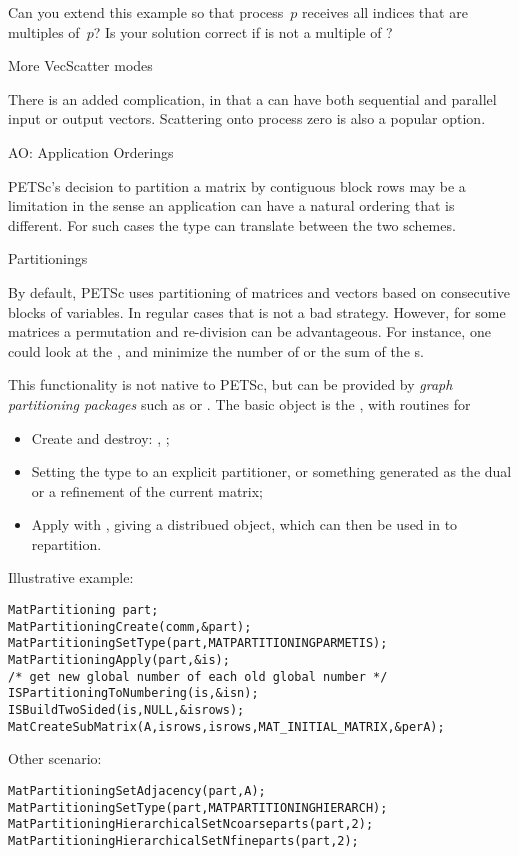 \begin{exercise}
  Can you extend this example so that process~$p$ receives
  all indices that are multiples of~$p$? Is your solution correct if
   is not a multiple of ?
\end{exercise}

 {More VecScatter modes}

There is an added complication, in that a  can
have both sequential and parallel input or output vectors.
Scattering onto process zero is also a popular option.

 {AO: Application Orderings}

PETSc's decision to partition a matrix by contiguous block rows
may be a limitation in the sense an application can have a natural
ordering that is different. For such cases the  type
can translate between the two schemes.

 {Partitionings}

By default, PETSc uses partitioning of matrices and vectors based on
consecutive blocks of variables.
In regular cases that is not a bad strategy.
However, for some matrices a permutation and re-division can
be advantageous.
For instance, one could look at the ,
and minimize the number of 
or the sum of the s.

This functionality is not native to PETSc, but can be provided by
\emph{graph partitioning packages}
such as  or .
The basic object is the ,
with routines for 
\begin{itemize}
\item Create and destroy: ,
  ;
\item Setting the type 
  to an explicit partitioner, or something generated
  as the dual or a refinement of the current matrix;
\item Apply with ,
  giving a distribued  object,
  which can then be used in 
  to repartition.
\end{itemize}
Illustrative example:
\begin{lstlisting}
MatPartitioning part;
MatPartitioningCreate(comm,&part);
MatPartitioningSetType(part,MATPARTITIONINGPARMETIS);
MatPartitioningApply(part,&is);
/* get new global number of each old global number */
ISPartitioningToNumbering(is,&isn);
ISBuildTwoSided(is,NULL,&isrows);
MatCreateSubMatrix(A,isrows,isrows,MAT_INITIAL_MATRIX,&perA);
\end{lstlisting}

Other scenario:
\begin{lstlisting}
MatPartitioningSetAdjacency(part,A);
MatPartitioningSetType(part,MATPARTITIONINGHIERARCH);
MatPartitioningHierarchicalSetNcoarseparts(part,2);
MatPartitioningHierarchicalSetNfineparts(part,2);
\end{lstlisting}
